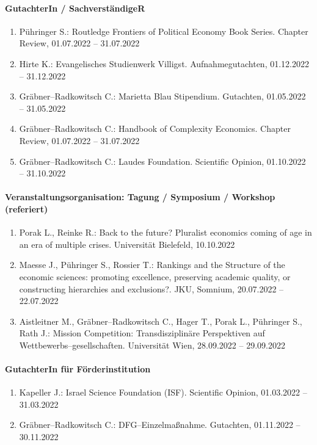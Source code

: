 \paragraph{GutachterIn / SachverständigeR}
\begin{enumerate}[leftmargin=*, labelsep=0.5cm]
\item Pühringer S.: Routledge Frontiers of Political Economy Book Series. Chapter Review, 01.07.2022 -- 31.07.2022
\item Hirte K.: Evangelisches Studienwerk Villigst. Aufnahmegutachten, 01.12.2022 -- 31.12.2022
\item Gräbner--Radkowitsch C.: Marietta Blau Stipendium. Gutachten, 01.05.2022 -- 31.05.2022
\item Gräbner--Radkowitsch C.: Handbook of Complexity Economics. Chapter Review, 01.07.2022 -- 31.07.2022
\item Gräbner--Radkowitsch C.: Laudes Foundation. Scientific Opinion, 01.10.2022 -- 31.10.2022
\end{enumerate}
\paragraph{Veranstaltungsorganisation: Tagung / Symposium / Workshop (referiert)}
\begin{enumerate}[leftmargin=*, labelsep=0.5cm]
\item Porak L., Reinke R.: Back to the future? Pluralist economics coming of age in an era of multiple crises. Universität Bielefeld, 10.10.2022
\item Maesse J., Pühringer S., Rossier T.: Rankings and the Structure of the economic sciences: promoting excellence, preserving academic quality, or constructing hierarchies and exclusions?. JKU, Somnium, 20.07.2022 -- 22.07.2022
\item Aistleitner M., Gräbner--Radkowitsch C., Hager T., Porak L., Pühringer S., Rath J.: Mission Competition: Transdisziplinäre Perspektiven auf Wettbewerbs--gesellschaften. Universität Wien, 28.09.2022 -- 29.09.2022
\end{enumerate}
\paragraph{GutachterIn für Förderinstitution}
\begin{enumerate}[leftmargin=*, labelsep=0.5cm]
\item Kapeller J.: Israel Science Foundation (ISF). Scientific Opinion, 01.03.2022 -- 31.03.2022
\item Gräbner--Radkowitsch C.: DFG--Einzelmaßnahme. Gutachten, 01.11.2022 -- 30.11.2022
\end{enumerate}
